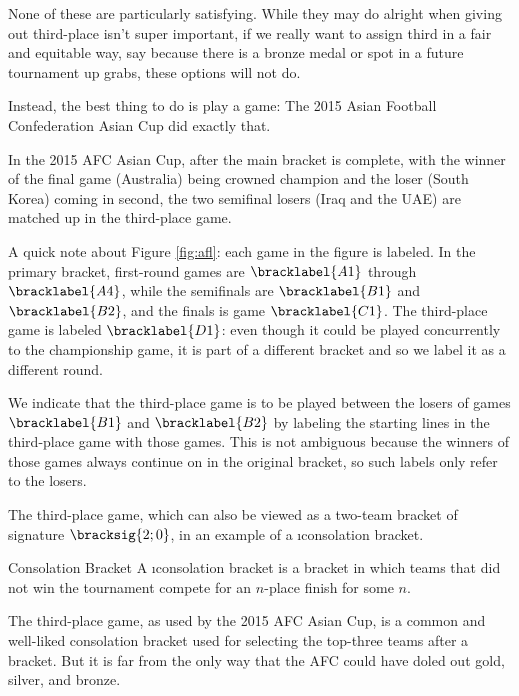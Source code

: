 {    None of these are particularly satisfying. While they may do alright when giving out third-place isn't super important, if we really want to assign third in a fair and equitable way, say because there is a bronze medal or spot in a future tournament up grabs, these options will not do.

    Instead, the best thing to do is play a game: The 2015 Asian Football Confederation Asian Cup did exactly that.


    In the 2015 AFC Asian Cup, after the main bracket is complete, with the winner of the final game (Australia) being crowned champion and the loser (South Korea) coming in second, the two semifinal losers (Iraq and the UAE) are matched up in the third-place game.

    A quick note about Figure \ref{fig:afl}: each game in the figure is labeled. In the primary bracket, first-round games are $\bracklabel{A1}$ through $\bracklabel{A4}$, while the semifinals are $\bracklabel{B1}$ and $\bracklabel{B2}$, and the finals is game $\bracklabel{C1}$. The third-place game is labeled $\bracklabel{D1}$: even though it could be played concurrently to the championship game, it is part of a different bracket and so we label it as a different round. %

    We indicate that the third-place game is to be played between the losers of games $\bracklabel{B1}$ and $\bracklabel{B2}$ by labeling the starting lines in the third-place game with those games. This is not ambiguous because the winners of those games always continue on in the original bracket, so such labels only refer to the losers.

    The third-place game, which can also be viewed as a two-team bracket of signature $\bracksig{2;0}$, in an example of a \i{consolation bracket}.

    \begin{definition}{Consolation Bracket}{}
        A \i{consolation bracket} is a bracket in which teams that did not win the tournament compete for an $n$-place finish for some $n$.
    \end{definition}

    The third-place game, as used by the 2015 AFC Asian Cup, is a common and well-liked consolation bracket used for selecting the top-three teams after a bracket. But it is far from the only way that the AFC could have doled out gold, silver, and bronze.
    
}
